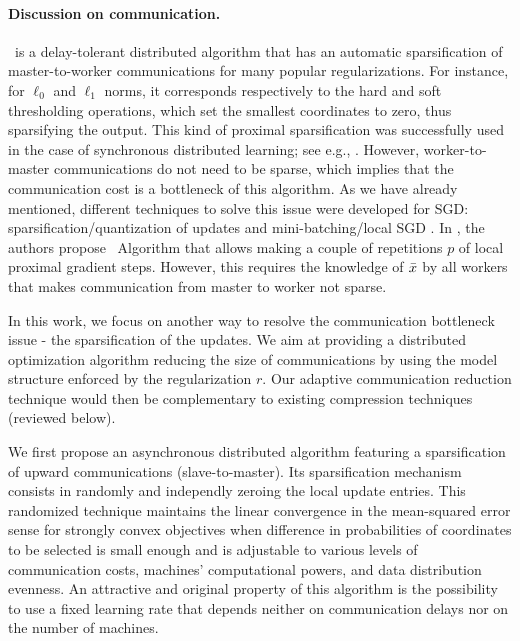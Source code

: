 {
\paragraph{Discussion on communication.}
\dave~is a delay-tolerant distributed algorithm that has an automatic sparsification of master-to-worker communications for many popular regularizations. For instance, for $\ell_0$ and $\ell_1$ norms, it corresponds respectively to the hard and soft thresholding operations, which set the smallest coordinates to zero, thus sparsifying the output. This kind of proximal sparsification was successfully used in the case of synchronous distributed learning; see e.g., \cite{wang2017efficient,smith2015l1}. However, worker-to-master communications do not need to be sparse, which implies that the communication cost is a bottleneck of this algorithm. As we have already mentioned, different techniques to solve this issue were developed for SGD: sparsification/quantization of updates \cite{horvath2019stochastic} and mini-batching/local SGD \cite{yang2013trading, khaled2019first}. In \cite{mishchenko2018,ICML18}, the authors propose \daveR~Algorithm that allows making a couple of repetitions $p$ of local proximal gradient steps. However, this requires the knowledge of $\bar{x}$ by all workers that makes communication from master to worker not sparse.

In this work, we focus on another way to resolve the communication bottleneck issue - the sparsification of the updates. We aim at providing a distributed optimization algorithm reducing the size of communications by using the model structure enforced by the regularization $r$. Our adaptive communication reduction technique would then be complementary to existing compression techniques (reviewed below).

We first propose an asynchronous distributed algorithm featuring a sparsification of upward communications (slave-to-master). Its sparsification mechanism consists in {{randomly and independly}} zeroing the local update entries. This randomized technique maintains the linear convergence in the mean-squared error sense for strongly convex objectives {{when difference in probabilities of coordinates to be selected is small enough}} and is adjustable to various levels of communication costs, machines' computational powers, and data distribution evenness. An attractive and original property of this algorithm is the possibility to use a fixed learning rate that depends neither on communication delays nor on the number of machines.

}
